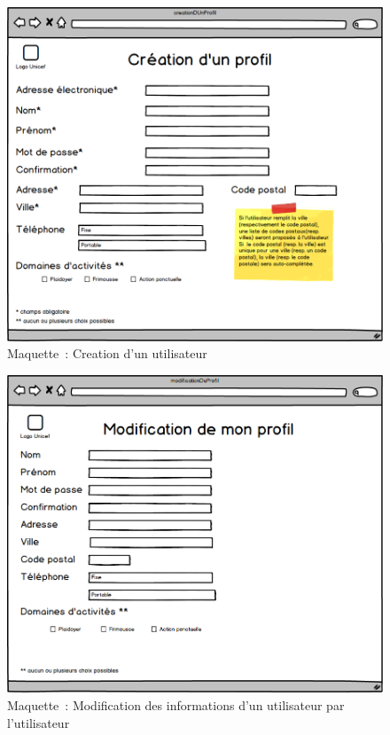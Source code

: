\begin{figure}[H]
	\centering
	\includegraphics[scale=0.4]{images/maquettes/fonctionnalite1CreationDUnProfil.png}
	 \caption{Maquette~: Creation d'un utilisateur}
 \label{fonctionnalite1creationDUnUtilisateurs}
\end{figure}

\begin{figure}[H]
	\centering
	\includegraphics[scale=0.4]{images/maquettes/fonctionnalite1ModificationDUnProfil.png}
	 \caption{Maquette~: Modification des informations d'un utilisateur par l'utilisateur}
	 \label{fonctionnalite1modificationDUnProfil}
\end{figure}


